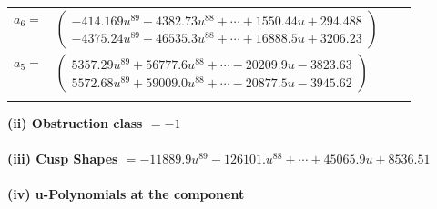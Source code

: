 \documentclass[1p]{elsarticle_modified}
\theoremstyle{definition}
\begin{document}
\begin{tabular}{m{7pt} m{180pt} m{7pt} m{180pt} }
\flushright $a_{6}=$&$\begin{pmatrix}-414.169 u^{89}-4382.73 u^{88}+\cdots+1550.44 u+294.488\\-4375.24 u^{89}-46535.3 u^{88}+\cdots+16888.5 u+3206.23\end{pmatrix}$ \\
\flushright $a_{5}=$&$\begin{pmatrix}5357.29 u^{89}+56777.6 u^{88}+\cdots-20209.9 u-3823.63\\5572.68 u^{89}+59009.0 u^{88}+\cdots-20877.5 u-3945.62\end{pmatrix}$\\&\end{tabular}
\flushleft \textbf{(ii) Obstruction class $= -1$}\\~\\
\flushleft \textbf{(iii) Cusp Shapes $= -11889.9 u^{89}-126101. u^{88}+\cdots+45065.9 u+8536.51$}\\~\\
\newpage\renewcommand{\arraystretch}{1}
\flushleft \textbf{(iv) u-Polynomials at the component}\newline \\
\end{document}
